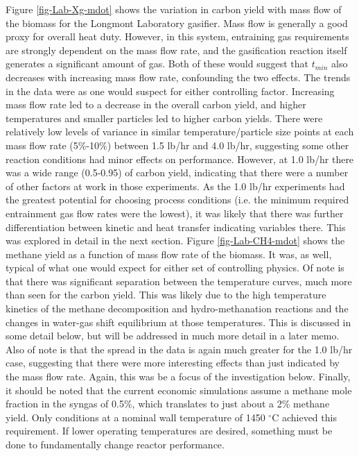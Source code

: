 \documentclass[11pt,twocolumn]{article}
\begin{document}
Figure \ref{fig-Lab-Xg-mdot} shows the variation in carbon yield with mass flow of the biomass for the Longmont Laboratory gasifier.  Mass flow is generally a good proxy for overall heat duty.  However, in this system, entraining gas requirements are strongly dependent on the mass flow rate, and the gasification reaction itself generates a significant amount of gas.  Both of these would suggest that $t_{min}$ also decreases with increasing mass flow rate, confounding the two effects.  The trends in the data were as one would suspect for either controlling factor.  Increasing mass flow rate led to a decrease in the overall carbon yield, and higher temperatures and smaller particles led to higher carbon yields.  There were relatively low levels of variance in similar temperature/particle size points at each mass flow rate (5\%-10\%) between 1.5 lb/hr and 4.0 lb/hr, suggesting some other reaction conditions had minor effects on performance.  However, at 1.0 lb/hr there was a wide range (0.5-0.95) of carbon yield, indicating that there were a number of other factors at work in those experiments.  As the 1.0 lb/hr experiments had the greatest potential for choosing process conditions (i.e. the minimum required entrainment gas flow rates were the lowest), it was likely that there was further differentiation between kinetic and heat transfer indicating variables there.  This was explored in detail in the next section.  Figure \ref{fig-Lab-CH4-mdot} shows the methane yield as a function of mass flow rate of the biomass.  It was, as well, typical of what one would expect for either set of controlling physics.  Of note is that there was significant separation between the temperature curves, much more than seen for the carbon yield.  This was likely due to the high temperature kinetics of the methane decomposition and hydro-methanation reactions and the changes in water-gas shift equilibrium at those temperatures.  This is discussed in some detail below, but will be addressed in much more detail in a later memo.  Also of note is that the spread in the data is again much greater for the 1.0 lb/hr case, suggesting that there were more interesting effects than just indicated by the mass flow rate.  Again, this was be a focus of the investigation below.  Finally, it should be noted that the current economic simulations assume a methane mole fraction in the syngas of 0.5\%, which translates to just about a 2\% methane yield.  Only conditions at a nominal wall temperature of 1450 $^{\circ}$C achieved this requirement.  If lower operating temperatures are desired, something must be done to fundamentally change reactor performance.
\end{document}
